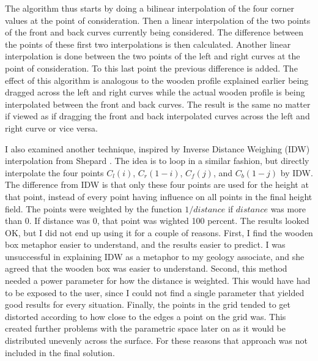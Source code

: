 \documentclass[a4paper,12pt]{report}
\begin{document}
The algorithm thus starts by doing a bilinear interpolation of the four corner values at the point of consideration. Then a linear interpolation of the two points of the front and back curves currently being considered. The difference between the points of these first two interpolations is then calculated. Another linear interpolation is done between the two points of the left and right curves at the point of consideration. To this last point the previous difference is added. The effect of this algorithm is analogous to the wooden profile explained earlier being dragged across the left and right curves while the actual wooden profile is being interpolated between the front and back curves. The result is the same no matter if viewed as if dragging the front and back interpolated curves across the left and right curve or vice versa.





I also examined another technique, inspired by Inverse Distance Weighing (IDW) interpolation from Shepard \cite{shepard1968two}. The idea is to loop in a similar fashion, but directly interpolate the four points $C_l(i)$, $C_r(1-i)$, $C_f(j)$, and $C_b(1-j)$ by IDW. The difference from IDW is that only these four points are used for the height at that point, instead of every point having influence on all points in the final height field. The points were weighted by the function $1/distance$ if $distance$ was more than 0. If distance was 0, that point was wighted 100 percent. The results looked OK, but I did not end up using it for a couple of reasons. First, I find the wooden box metaphor easier to understand, and the results easier to predict. I was unsuccessful in explaining IDW as a metaphor to my geology associate, and she agreed that the wooden box was easier to understand. Second, this method needed a power parameter for how the distance is weighted. This would have had to be exposed to the user, 
since I could not find a single parameter that yielded good results for every situation. Finally, 
the points in the grid tended to get distorted according to how close to the edges a point on the grid was. This created further problems with the parametric space later on as it would be distributed unevenly across the surface. For these reasons that approach was not included in the final solution.
\end{document}
